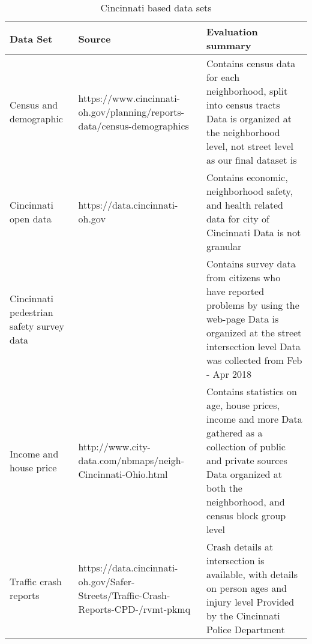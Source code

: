 \documentclass{llncs}
\begin{document}
\begin{table}[!h]
\begin{center}
\caption{Cincinnati based data sets}
\label{table:cincinnatidatasets}
\begin{tabular}{ p{}  p{}  p{}}
\hline
\rule{0pt}{12pt}
Data Set
	& Source
	& Evaluation summary\\[2pt]
\hline
Census and demographic
	&https://www.cincinnati-oh.gov/planning/reports-data/census-demographics
	&Contains census data for each neighborhood, split into census tracts\newline
	Data is organized at the neighborhood level, not street level as our final dataset is\\
Cincinnati open data
	&https://data.cincinnati-oh.gov
	& Contains economic, neighborhood safety, and health related data for city of Cincinnati\newline
	Data is not granular\\
Cincinnati pedestrian safety survey data
	&
	& 
	Contains survey data from citizens who have reported problems by using the web-page\newline
	Data is organized at  the street intersection level\newline
	  Data was collected from Feb - Apr 2018\\
Income and house price
	&http://www.city-data.com/nbmaps/neigh-Cincinnati-Ohio.html
	& Contains statistics on age, house prices, income and more\newline
	Data gathered as a collection of public and private sources\newline
	Data organized at both the neighborhood, and census block group level\\
Traffic crash reports
	&https://data.cincinnati-oh.gov/Safer-Streets/Traffic-Crash-Reports-CPD-/rvmt-pkmq
	& Crash details at intersection is available, with details on person ages and injury level \newline
	Provided by the Cincinnati Police Department \\[2pt]
\hline
\end{tabular}
\end{center}
\end{table}
\FloatBarrier
%
\FloatBarrier
\end{document}
